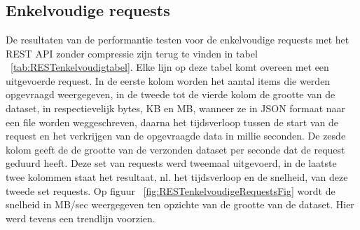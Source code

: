 
\chapter{}%
\label{ch:bevindingen}

\section{Enkelvoudige requests}

De resultaten van de performantie testen voor de enkelvoudige requests met het REST API zonder compressie zijn terug te vinden in tabel ~\ref{tab:RESTenkelvoudigtabel}.
Elke lijn op deze tabel komt overeen met een uitgevoerde request. In de eerste kolom worden het aantal items die werden opgevraagd weergegeven,
in de tweede tot de vierde kolom de grootte van de dataset, in respectievelijk bytes, KB en MB, wanneer ze in JSON formaat naar een file worden weggeschreven,
daarna het tijdsverloop tussen de start van de request en het verkrijgen van de opgevraagde data in millie seconden. De zesde kolom geeft de de grootte van de
verzonden dataset per seconde dat de request geduurd heeft. Deze set van requests werd tweemaal uitgevoerd, in de laatste twee kolommen staat het resultaat, nl. het tijdsverloop en de snelheid,
van deze tweede set requests.
Op figuur ~\ref{fig:RESTenkelvoudigeRequestsFig} wordt de snelheid in MB/sec weergegeven ten opzichte van de grootte van de dataset. Hier werd tevens een trendlijn voorzien.

